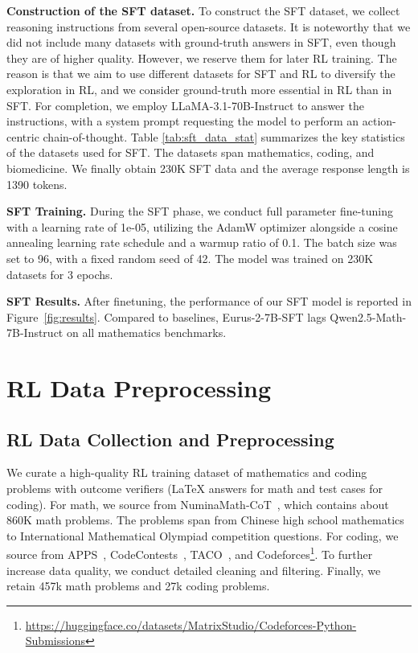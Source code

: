 \textbf{Construction of the SFT dataset.} To construct the SFT dataset, we collect reasoning instructions from several open-source datasets. It is noteworthy that we did not include many datasets with ground-truth answers in SFT, even though they are of higher quality. However, we reserve them for later RL training. The reason is that we aim to use different datasets for SFT and RL to diversify the exploration in RL, and we consider ground-truth more essential in RL than in SFT.  For completion, we employ LLaMA-3.1-70B-Instruct to answer the instructions, with a system prompt requesting the model to perform an action-centric chain-of-thought. Table \ref{tab:sft_data_stat} summarizes the key statistics of the datasets used for SFT. The datasets span mathematics, coding, and biomedicine. We finally obtain 230K SFT data and the average response length is 1390 tokens.

\textbf{SFT Training.}  During the SFT phase, we conduct full parameter fine-tuning with a learning rate of 1e-05, utilizing the AdamW optimizer alongside a cosine annealing learning rate schedule and a warmup ratio of 0.1. The batch size was set to 96, with a fixed random seed of 42. The model was trained on 230K datasets for 3 epochs.

\textbf{SFT Results.}
After finetuning, the performance of our SFT model is reported in Figure~\ref{fig:results}.
Compared to baselines, Eurus-2-7B-SFT lags Qwen2.5-Math-7B-Instruct on all mathematics benchmarks.






\section{RL Data Preprocessing}
\label{sec:rl_data_process}
\subsection{RL Data Collection and Preprocessing}

We curate a high-quality RL training dataset of mathematics and coding problems with outcome verifiers (LaTeX answers for math and test cases for coding). For math, we source from NuminaMath-CoT~\citep{li2024numinamath},  which contains about 860K math problems. The problems span from Chinese high school mathematics to International Mathematical Olympiad competition questions. For coding, we source from APPS~\citep{apps}, CodeContests~\citep{li2022competition}, TACO~\citep{li2023taco}, and Codeforces\footnote{\url{https://huggingface.co/datasets/MatrixStudio/Codeforces-Python-Submissions}}. To further increase data quality, we conduct detailed cleaning and filtering. Finally, we retain 457k math problems and 27k coding problems.

